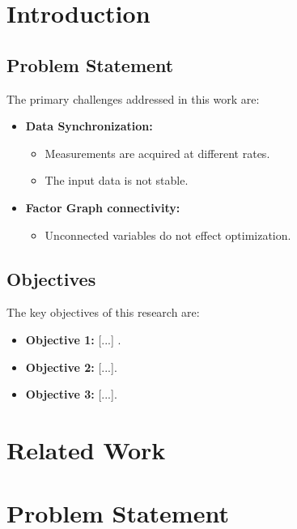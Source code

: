 \documentclass[conference]{IEEEtran} %
\begin{document}
\section{Introduction}
\label{sec:introduction}

\subsection{Problem Statement}
\label{subsec:problem_statement}
The primary challenges addressed in this work are:
\begin{itemize}
    \item \textbf{Data Synchronization:}
    \begin{itemize}
        \item Measurements are acquired at different rates.
        \item The input data is not stable.
\end{itemize}

\item \textbf{Factor Graph connectivity:}
\begin{itemize}
    \item Unconnected variables do not effect optimization.
\end{itemize}
\end{itemize}

\subsection{Objectives}
\label{subsec:objectives}
The key objectives of this research are:
\begin{itemize}
    \item \textbf{Objective 1:} [...] .
    \item \textbf{Objective 2:} [...].
    \item \textbf{Objective 3:} [...].
\end{itemize}


\section{Related Work}
\label{sec:related_work}

\section{Problem Statement}
\label{sec:problem_statement}
\end{document}
